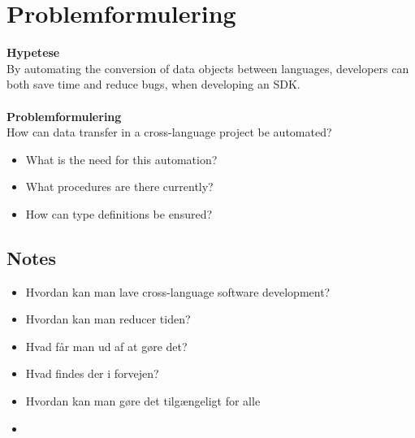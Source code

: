 \section*{Problemformulering}

\textbf{Hypetese} \\
By automating the conversion of data objects between languages, developers can both save time and reduce bugs, when developing an SDK.
\\ \\ 
\textbf{Problemformulering} \\
How can data transfer in a cross-language project be automated?

\begin{itemize}
    \item What is the need for this automation?
    \item What procedures are there currently?
    \item How can type definitions be ensured?
\end{itemize}

\subsection*{Notes}
\begin{itemize}
    \item Hvordan kan man lave cross-language software development?
    \item Hvordan kan man reducer tiden?
    \item Hvad får man ud af at gøre det?
    \item Hvad findes der i forvejen?
    \item Hvordan kan man gøre det tilgængeligt for alle
    \item 
\end{itemize}